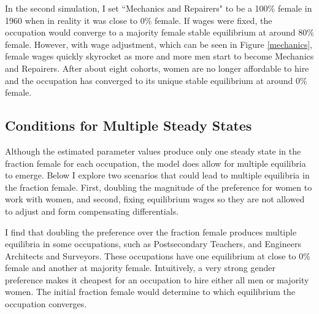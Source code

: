 \documentclass[12pt]{article}
\begin{document}


In the second simulation, I set ``Mechanics and Repairers" to be a 100\% female in 1960 when in reality it was close to 0\% female. If wages were fixed, the occupation would converge to a majority female stable equilibrium at around 80\% female. However, with wage adjustment, which can be seen in Figure \ref{mechanics}, female wages quickly skyrocket as more and more men start to become Mechanics and Repairers. After about eight cohorts, women are no longer affordable to hire and the occupation has converged to its unique stable equilibrium at around 0\% female.

\subsection{Conditions for Multiple Steady States}
Although the estimated parameter values produce only one steady state in the fraction female for each occupation, the model does allow for multiple equilibria to emerge. Below I explore two scenarios that could lead to multiple equilibria in the fraction female. First, doubling the magnitude of the preference for women to work with women, and second, fixing equilibrium wages so they are not allowed to adjust and form compensating differentials.


I find that doubling the preference over the fraction female produces multiple equilibria in some occupations, such as Postsecondary Teachers, and Engineers Architects and Surveyors. These occupations have one equilibrium at close to 0\% female and another at majority female. Intuitively, a very strong gender preference makes it cheapest for an occupation to hire either all men or majority women. The initial fraction female would determine to which equilibrium the occupation converges. 

\end{document}
